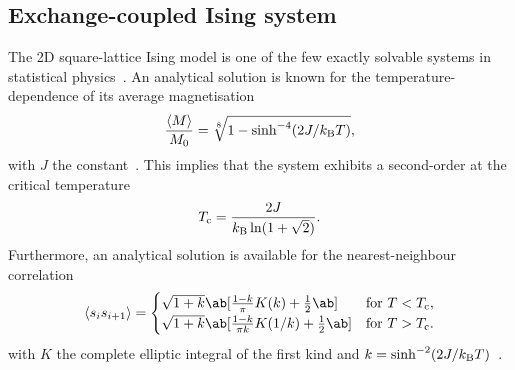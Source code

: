 
\subsection{Exchange-coupled Ising system}
\label{sec:2:Verification_OOP_Exchange}
The 2D square-lattice  Ising model is one of the few exactly solvable systems in statistical physics~\cite{ExactlySolvedModelsStatMech}.
An analytical solution is known for the temperature-dependence of its average magnetisation
\begin{equation}
	\label{eq:2:Verification_exchange_M}
	\frac{\langle M \rangle}{M_0} = \sqrt[8]{1 - \sinh^{-4}(2J/\kBT)} \mathrm{,}
\end{equation}
with $J$ the  constant~\cite{Correlations2DIsing,IsingSpontaneousMagnetization,coey2010magnetism}.
This implies that the system exhibits a second-order  at the critical temperature~\cite{ExactlySolvedModelsStatMech}
\begin{equation}
	T_\mathrm{c} = \frac{2J}{\kB \ln(1 + \sqrt{2})} \mathrm{.}
\end{equation}
Furthermore, an analytical solution is available for the nearest-neighbour correlation
\begin{equation}
	\label{eq:2:Verification_exchange_corr}
	\langle s_i s_{i+1} \rangle = 
	\begin{cases}
		\sqrt{1+k} \ab[\frac{1-k}{\pi}K(k) + \frac{1}{2} \ab] &\text{for } T < T_\mathrm{c} \mathrm{,} \\ 
		\sqrt{1+k} \ab[\frac{1-k}{\pi k}K(1/k) + \frac{1}{2} \ab] &\text{for } T > T_\mathrm{c} \mathrm{.} \\ 
	\end{cases}
\end{equation}
with $K$ the complete elliptic integral of the first kind and $k=\sinh^{-2}(2J/\kBT)$~\cite{Correlations2DIsing}. \\\par

